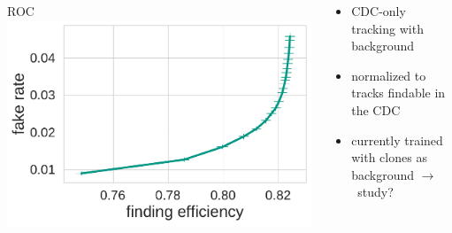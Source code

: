 \documentclass[18pt, aspectratio=169]{beamer}
\begin{document}
\begin{frame}
\begin{columns}
\begin{column}{.33\textwidth}
    \end{column}
  \end{columns}
  \begin{columns}
    \begin{column}{.4\textwidth}
      \centering
      ROC
      \includegraphics[width=\textwidth]{figures/cdc-qi-new/roc_curve.pdf}
    \end{column}
    \begin{column}{.6\textwidth}
      \begin{itemize}
      \item CDC-only tracking with background
      \item normalized to tracks findable in the CDC
      \item currently trained with clones as background $\rightarrow$~study?
      \end{itemize}
    \end{column}
  \end{columns}
\end{frame}
\end{document}
